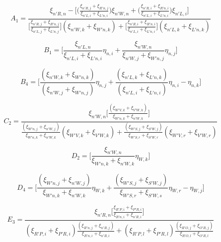 \documentclass{article}
\begin{document}
\begin{displaymath}
	A_{1} = \frac{\xi_{n'R,n} -\Bigg[\Bigg(\frac{\xi_{n'R,j}+\xi_{R'n,j}}{\xi_{n'L,i}+\xi_{L'n,i}}\Bigg)\xi_{n'W,n}+\Bigg(\frac{\xi_{n'R,i}+\xi_{R'n,i}}{\xi_{n'L,i}+\xi_{L'n,i}}\Bigg)\xi_{n'L,i}\Bigg]}{\Bigg[\frac{\xi_{n'R,j} + \xi_{R'n,j}}{\xi_{n'L,j} + \xi_{L'n,j}} \Bigg](\xi_{n'W,k} + \xi_{W'n,k}) + \Bigg[ \frac{\xi_{n'R,i} + \xi_{R'n,i}}{\xi_{n'L,i} + \xi_{L'n,i}} \Bigg](\xi_{n'L,k}+\xi_{L'n,k})}
\end{displaymath}

\begin{displaymath}
B_{1} = \Bigg[\frac{\xi_{n'L,n}}{\xi_{n'L,i} + \xi_{L'n,i}}\eta_{n,i} + \frac{\xi_{n'W,n}}{\xi_{n'W,j} + \xi_{W'n,j}}\eta_{n,j} \Bigg]
\end{displaymath}

\begin{displaymath}
B_{4} = \Bigg[ \frac{(\xi_{n'W,k} + \xi_{W'n,k})}{(\xi_{n'W,j} + \xi_{W'n,j})}\eta_{n,j} + \frac{(\xi_{n'L,k} + \xi_{L'n,k})}{(\xi_{n'L,i} + \xi_{L'n,i})}\eta_{n,i} -\eta_{n,k} \Bigg]
\end{displaymath}

\begin{displaymath}
C_{2} =  \frac{\xi_{n'W,n}\Bigg[\frac{(\xi_{W'V,k}+\xi_{V'W,k})}{\xi_{W'n,k}+\xi_{n'W,k}}\Bigg]}{\frac{(\xi_{W'n,j}+\xi_{n'W,j})}{\xi_{W'n,k}+\xi_{n'W,k}}(\xi_{W'V,k}+\xi_{V'W,k})+\frac{(\xi_{W'S,j}+\xi_{S'W,j})}{\xi_{W'S,r}+\xi_{S'W,r}}(\xi_{W'V,r}+\xi_{V'W,r})}
\end{displaymath}

\begin{displaymath}
D_{2} = \Bigg[\frac{\xi_{n'W,n}}{\xi_{W'n,k}+\xi_{n'W,k}}\eta_{W,k}\Bigg]
\end{displaymath}

\begin{displaymath}
D_{4} = \Bigg[\frac{(\xi_{W'n,j}+\xi_{n'W,j})}{\xi_{W'n,k}+\xi_{n'W,k}}\eta_{W,k}+\frac{(\xi_{W'S,j}+\xi_{S'W,j})}{\xi_{W'S,r}+\xi_{S'W,s}}\eta_{W,r}- \eta_{W,j}\Bigg]
\end{displaymath}

\begin{displaymath}
E_{3} = \frac{\xi_{n'R,n}\Bigg[\frac{\xi_{R'P,i}+\xi_{P'R,i}}{\xi_{R'n,i}+\xi_{n'R,i}}\Bigg]}{(\xi_{R'P,i}+\xi_{P'R,i})\frac{(\xi_{R'n,j}+\xi_{n'R,j})}{\xi_{R'n,i}+\xi_{n'R,i}}
+(\xi_{R'P,l}+\xi_{P'R,l})\frac{(\xi_{R'O,j}+\xi_{O'R,j})}{\xi_{R'O,l}+\xi_{O'R,l}}}
\end{displaymath}
\end{document}
